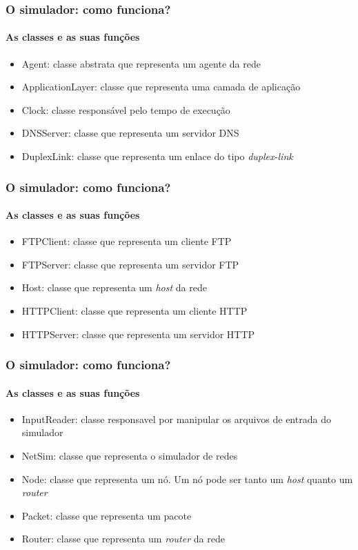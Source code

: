 \documentclass{beamer}
\begin{document}
\begin{frame}
	\frametitle{O simulador: como funciona?}
	\framesubtitle{As classes e as suas funções}
	\begin{itemize}
		\item Agent: classe abstrata que representa um agente da rede
		\item ApplicationLayer: classe que representa uma camada de aplicação
		\item Clock: classe responsável pelo tempo de execução
		\item DNSServer: classe que representa um servidor DNS
		\item DuplexLink: classe que representa um enlace do tipo \textit{duplex-link}
	\end{itemize}
\end{frame}

\begin{frame}
	\frametitle{O simulador: como funciona?}
	\framesubtitle{As classes e as suas funções}
	\begin{itemize}
		\item FTPClient: classe que representa um cliente FTP
		\item FTPServer: classe que representa um servidor FTP
		\item Host: classe que representa um \textit{host} da rede
		\item HTTPClient: classe que representa um cliente HTTP
		\item HTTPServer: classe que representa um servidor HTTP
	\end{itemize}
\end{frame}

\begin{frame}
	\frametitle{O simulador: como funciona?}
	\framesubtitle{As classes e as suas funções}
	\begin{itemize}
		\item InputReader: classe responsavel por manipular os arquivos de entrada do simulador
		\item NetSim: classe que representa o simulador de redes
		\item Node: classe que representa um nó. Um nó pode ser tanto um \textit{host} quanto um \textit{router}
		\item Packet: classe que representa um pacote
		\item Router: classe que representa um \textit{router} da rede 
	\end{itemize}
\end{frame}
\end{document}
